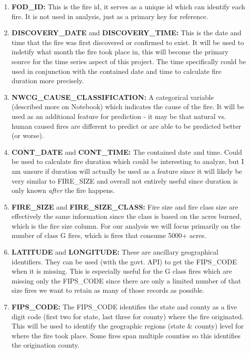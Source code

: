 \documentclass[12pt]{article}
\begin{document}
\begin{enumerate} \item \textbf{FOD\_ID:} This is the fire id, it serves as a unique id which can identify each fire. It is not used in analysis, just as a primary key for reference. 

\item \textbf{DISCOVERY\_DATE} and \textbf{DISCOVERY\_TIME:} This is the date and time that the fire was first discovered or confirmed to exist. It will be used to indetify what month the fire took place in, this will become the primary source for the time series aspect of this project. The time specifically could be used in conjunction with the contained date and time to calculate fire duration more precisely. 

\item \textbf{NWCG\_CAUSE\_CLASSIFICATION:} A categorical variable (described more on Notebook) which indicates the cause of the fire. It will be used as an additional feature for prediction - it may be that natural vs. human caused fires are different to predict or are able to be predicted better (or worse). 

\item \textbf{CONT\_DATE} and \textbf{CONT\_TIME:} The contained date and time. Could be used to calculate fire duration which could be interesting to analyze, but I am unsure if duration will actually be used as a feature since it will likely be very similar to FIRE\_SIZE and overall not entirely useful since duration is only known \textit{after} the fire happens. 

\item \textbf{FIRE\_SIZE} and \textbf{FIRE\_SIZE\_CLASS:} Fire size and fire class size are effectively the same information since the class is based on the acres burned, which is the fire size column. For our analysis we will focus primarily on the number of class G fires, which is fires that consume 5000+ acres. 

\item \textbf{LATITUDE} and \textbf{LONGITUDE:} These are ancillary geographical identifiers. They can be used (with the govt. API) to get the FIPS\_CODE when it is missing. This is especially useful for the G class fires which are missing only the FIPS\_CODE since there are only a limited number of that size fires we want to retain as many of those records as possible. 

\item \textbf{FIPS\_CODE:} The FIPS\_CODE identifies the state and county as a five digit code (first two for state, last three for county) where the fire originated. This will be used to identify the geographic regions (state \& county) level for where the fire took place. Some fires span multiple counties so this identifies the origination county. 

\end{enumerate}
\end{document}
